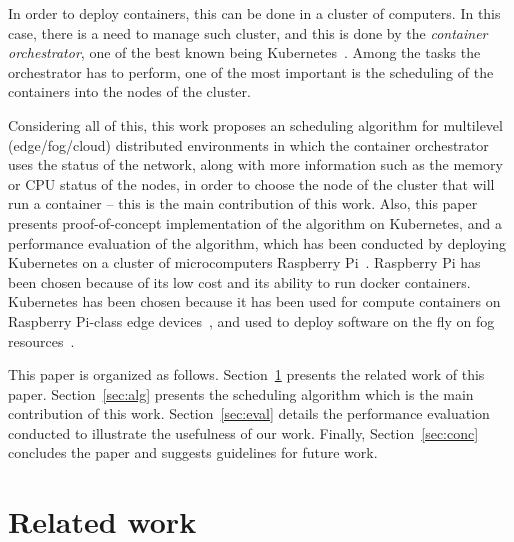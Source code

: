 \documentclass[conference]{IEEEtran}
\begin{document}
In order to deploy containers, this can be done in a cluster of computers. In this case, there is a need to manage such cluster, and this is done by the \emph{container orchestrator}, one of the best known being Kubernetes~\cite{Bernstein14b}. Among the tasks the orchestrator has to perform, one of the most important is the scheduling of the containers into the nodes of the cluster.


Considering all of this, this work proposes an scheduling algorithm for multilevel (edge/fog/cloud) distributed environments   in which the container orchestrator uses the status of the network, along with more information such as the memory or CPU status of the nodes, in order to choose the node of the cluster that will run a container -- this is the main contribution of this work. 
Also, this paper presents proof-of-concept implementation of the algorithm on Kubernetes, and a performance evaluation of the algorithm, which has been conducted by deploying Kubernetes on a cluster of microcomputers Raspberry Pi~\cite{VujovicM15}. Raspberry Pi has been chosen because of its low cost and its ability to run docker containers. Kubernetes has been chosen because it has been used for compute containers on Raspberry Pi-class edge devices~\cite{Tsai17}, and used to deploy software on the fly on fog resources~\cite{Hong16}. 

This paper is organized as follows. Section~\ref{sec:rel} presents the related work of this paper. Section~\ref{sec:alg} presents the scheduling algorithm which is the main contribution of this work. Section~\ref{sec:eval} details the performance evaluation conducted to illustrate the usefulness of our work. Finally, Section~\ref{sec:conc} concludes the paper and suggests guidelines for future work. 

\section{Related work}\label{sec:rel}
\end{document}

